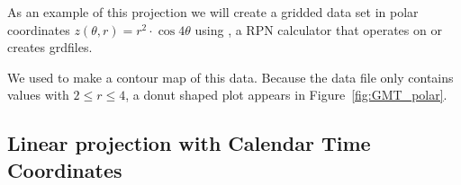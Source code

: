 As an example of this projection we will create a gridded data set
in polar coordinates $z(\theta, r) = r^2 \cdot \cos{4\theta}$
using , a RPN calculator that operates on or
creates grdfiles.

 

We used  to make a contour map of this data.  Because
the data file only contains values with $2 \leq r \leq 4$, a donut
shaped plot appears in Figure~\ref{fig:GMT_polar}.\

\subsection{Linear projection with Calendar Time Coordinates}
\label{sec:time}


